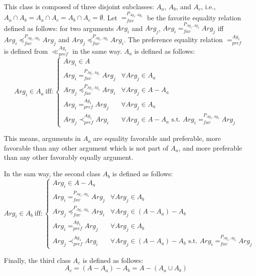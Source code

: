 This class is composed of three disjoint subclasses: $A_a$, $A_b$, and $A_c$, i.e., $A_a \cap A_b = A_a \cap A_c = A_b \cap A_c
=\emptyset$. Let $=_{fav}^{P_{Ag_1, Ag_2}}$ be the favorite equality relation defined as follows: for two arguments $Arg_i$ and
$Arg_j$, $Arg_i =_{fav}^{P_{Ag_1, Ag_2}} Arg_j$ iff $Arg_i \preceq_{fav}^{P_{Ag_1, Ag_2}} Arg_j$ and $Arg_j \preceq_{fav}^{P_{Ag_1, Ag_2}} Arg_i$.
The preference equality relation $=_{pref}^{Ag_1}$ is defined from $\ll_{pref}^{Ag_1}$ in the same way. $A_a$ is defined as follows:
\begin{equation}
Arg_i \in A_a~ \text{iff}:
\begin{cases}
Arg_i \in A
\\
Arg_i =_{fav}^{P_{Ag_1, Ag_2}} Arg_j & \forall Arg_j \in A_a
\\
Arg_j \preceq_{fav}^{P_{Ag_1, Ag_2}} Arg_i & \forall Arg_j \in
A-A_a
\\
Arg_i =_{pref}^{Ag_1} Arg_j & \forall Arg_j \in A_a
\\
Arg_j \prec_{pref}^{Ag_1} Arg_i & \forall Arg_j \in A-A_a
\text{~s.t.~} Arg_i =_{fav}^{P_{Ag_1, Ag_2}} Arg_j
\end{cases}
\end{equation}


This means, arguments in $A_a$ are equality favorable and preferable, more favorable than any other argument which is not
part of $A_a$, and more preferable than any other favorably equally argument.

In the sam way, the second class $A_b$ is defined as follows:
\begin{equation}
Arg_i \in A_b~ \text{iff}:
\begin{cases}
Arg_i \in A-A_a
\\
Arg_i =_{fav}^{P_{Ag_1, Ag_2}} Arg_j & \forall Arg_j \in A_b
\\
Arg_j \preceq_{fav}^{P_{Ag_1, Ag_2}} Arg_i & \forall Arg_j \in
(A-A_a)-A_b
\\
Arg_i =_{pref}^{Ag_1} Arg_j & \forall Arg_j \in A_b
\\
Arg_j \prec_{pref}^{Ag_1} Arg_i & \forall Arg_j \in (A-A_a)-A_b
\text{~s.t.~} Arg_i =_{fav}^{P_{Ag_1, Ag_2}} Arg_j
\end{cases}
\end{equation}

Finally, the third class $A_c$ is defined as follows:
\begin{equation}
A_c = (A-A_a)-A_b = A-(A_a \cup A_b)
\end{equation}



